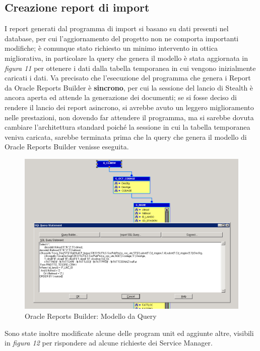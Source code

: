 \subsection{Creazione report di import}
I report generati dal programma di import si basano su dati presenti nel database, per cui l'aggiornamento del progetto non ne comporta importanti modifiche; è comunque stato richiesto un minimo intervento in ottica migliorativa, in particolare la query che genera il modello è stata aggiornata in \textit{figura 11} per ottenere i dati dalla tabella temporanea in cui vengono inizialmente caricati i dati. Va precisato che l'esecuzione del programma che genera i Report da Oracle Reports Builder è \textbf{sincrono}, per cui la sessione del lancio di Stealth è ancora aperta ed attende la generazione dei documenti; se si fosse deciso di rendere il lancio dei report asincrono, si avrebbe avuto un leggero miglioramento nelle prestazioni, non dovendo far attendere il programma, ma si sarebbe dovuta cambiare l'architettura standard poiché la sessione in cui la tabella temporanea veniva caricata, sarebbe terminata prima che la query che genera il modello di Oracle Reports Builder venisse eseguita.\\
\begin{figure}[!h]
\thispagestyle{empty}
\centering
\includegraphics[scale=0.60]{img/QueryRep.png}
\caption{Oracle Reports Builder: Modello da Query}
\end{figure}
\newpage
Sono state inoltre modificate alcune delle program unit ed aggiunte altre, visibili in \textit{figura 12} per rispondere ad alcune richieste dei Service Manager.\\

